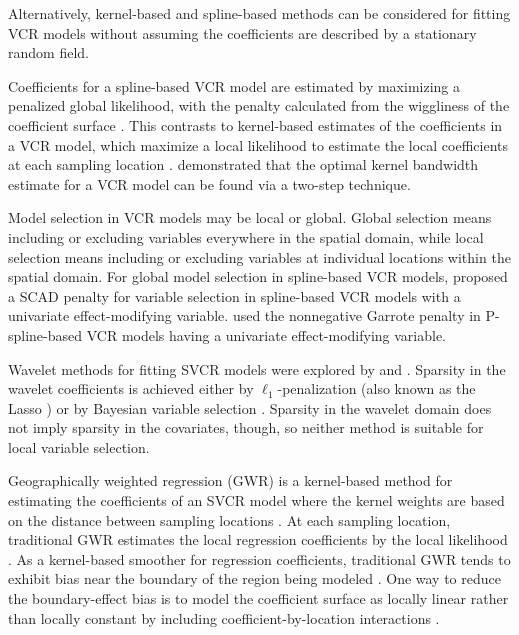 \documentclass[authoryear, review, 11pt]{elsarticle}
\begin{document}
	Alternatively, kernel-based and spline-based methods can be considered for fitting VCR models without assuming the coefficients are described by a stationary random field. 

Coefficients for a spline-based VCR model are estimated by maximizing a penalized global likelihood, with the penalty calculated from the wiggliness of the coefficient surface \citep{Wood:2006}. This contrasts to kernel-based estimates of the coefficients in a VCR model, which maximize a local likelihood to estimate the local coefficients at each sampling location \citep{Loader:1999}. \cite{Fan:1999} demonstrated that the optimal kernel bandwidth estimate for a VCR model can be found via a two-step technique.
	
	Model selection in VCR models may be local or global. Global selection means including or excluding variables everywhere in the spatial domain, while local selection means including or excluding variables at individual locations within the spatial domain. For global model selection in spline-based VCR models, \cite{Wang:2008a} proposed a SCAD penalty \citep{Fan:2001} for variable selection in spline-based VCR models with a univariate effect-modifying variable. \cite{Antoniadis:2012a} used the nonnegative Garrote penalty \citep{Breiman:1995} in P-spline-based VCR models having a univariate effect-modifying variable.
	
	Wavelet methods for fitting SVCR models were explored by \cite{Shang-2011} and \cite{Zhang-2011}. Sparsity in the wavelet coefficients is achieved either by $\ell_1$-penalization (also known as the Lasso \citep{Tibshirani:1996}) \citep{Shang-2011} or by Bayesian variable selection \citep{Zhang-2011}. Sparsity in the wavelet domain does not imply sparsity in the covariates, though, so neither method is suitable for local variable selection.

	Geographically weighted regression (GWR) is a kernel-based method for estimating the coefficients of an SVCR model where the kernel weights are based on the distance between sampling locations \citep{Brundson:1998a, Fotheringham:2002}. At each sampling location, traditional GWR estimates the local regression coefficients by the local likelihood \citep{Loader:1999}. As a kernel-based smoother for regression coefficients, traditional GWR tends to exhibit bias near the boundary of the region being modeled \citep{Hastie:1993b}. One way to reduce the boundary-effect bias is to model the coefficient surface as locally linear rather than locally constant by including coefficient-by-location interactions \citep{Wang:2008b}.
	
\end{document}

